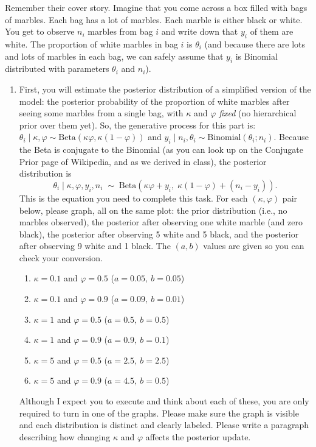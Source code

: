 \documentclass[11pt]{article}
\begin{document}
\begin{enumerate}
Remember their cover story. Imagine that you come across a box filled with bags of marbles. Each bag has a lot of marbles. Each marble is either black or white. You get to observe $n_i$ marbles from bag $i$ and write down that $y_i$ of them are white. The proportion of white marbles in bag $i$ is $\theta_i$ (and because there are lots and lots of marbles in each bag, we can safely assume that $y_i$ is Binomial distributed with parameters $\theta_i$ and $n_i$).
\begin{enumerate}

\item First, you will estimate the posterior distribution of a simplified version of the model: the posterior probability of the proportion of white marbles after seeing some marbles from a single bag, with $\kappa$ and $\varphi$ {\em fixed} (no hierarchical prior over them yet). So, the generative process for this part is: $\theta_i \mid \kappa, \varphi \sim \mathrm{Beta}\left(\kappa\varphi, \kappa(1-\varphi)\right)$ and $y_i \mid n_i, \theta_i \sim \mathrm{Binomial}(\theta_i; n_i)$. Because the Beta is conjugate to the Binomial (as you can look up on the Conjugate Prior page of Wikipedia, and as we derived in class), the posterior distribution is
\begin{equation*}
\theta_i \mid \kappa, \varphi, y_i, n_i \;\sim\; \mathrm{Beta}\left( \kappa\varphi + y_i,\; \kappa(1-\varphi) + (n_i - y_i) \right).
\end{equation*}
This is the equation you need to complete this task. For each $(\kappa, \varphi)$ pair below, please graph, all on the same plot: the prior distribution (i.e., no marbles observed), the posterior after observing one white marble (and zero black), the posterior after observing 5 white and 5 black, and the posterior after observing 9 white and 1 black. The $(a,b)$ values are given so you can check your conversion.
\begin{enumerate}
\item $\kappa = 0.1$ and $\varphi = 0.5$ \quad ($a=0.05,\ b=0.05$)
\item $\kappa = 0.1$ and $\varphi = 0.9$ \quad ($a=0.09,\ b=0.01$)
\item $\kappa = 1$ and $\varphi = 0.5$ \quad ($a=0.5,\ b=0.5$)
\item $\kappa = 1$ and $\varphi = 0.9$ \quad ($a=0.9,\ b=0.1$)
\item $\kappa = 5$ and $\varphi = 0.5$ \quad ($a=2.5,\ b=2.5$)
\item $\kappa = 5$ and $\varphi = 0.9$ \quad ($a=4.5,\ b=0.5$)
\end{enumerate}
Although I expect you to execute and think about each of these, you are only required to turn in one of the graphs. Please make sure the graph is visible and each distribution is distinct and clearly labeled. Please write a paragraph describing how changing $\kappa$ and $\varphi$ affects the posterior update.


\end{enumerate}
\end{enumerate}
\end{document}
